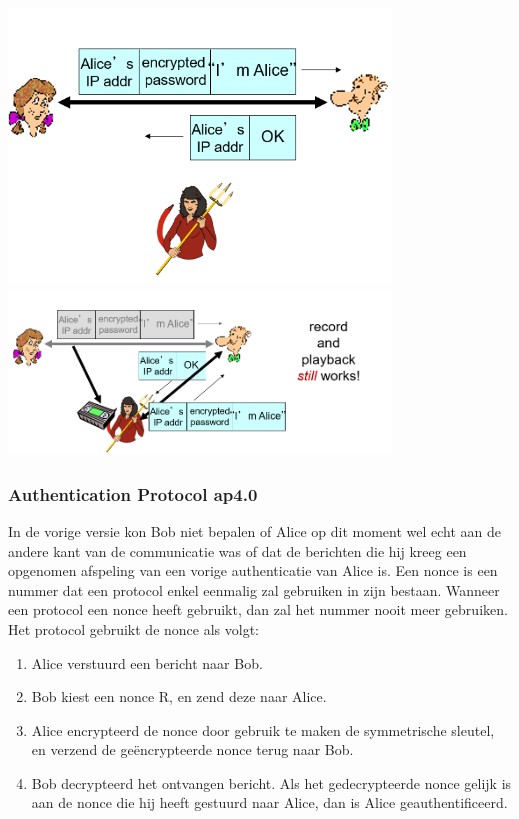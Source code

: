 \includegraphics[width=4in]{./img/imghfdst8/hfdst8puntje18.png}\\[1cm]

\includegraphics[width=4in]{./img/imghfdst8/hfdst8puntje19.png}\\[1cm]

\subsubsection{Authentication Protocol ap4.0}

In de vorige versie kon Bob niet bepalen of Alice op dit moment wel echt aan de andere kant van de communicatie was of dat de berichten die hij kreeg een opgenomen afspeling van een vorige authenticatie van Alice is. Een nonce is een nummer dat een protocol enkel eenmalig zal gebruiken in zijn bestaan. Wanneer een protocol een nonce heeft gebruikt, dan zal het nummer nooit meer gebruiken. Het protocol gebruikt de nonce als volgt:
\begin{enumerate}
    \item Alice verstuurd een bericht naar Bob.
\item Bob kiest een nonce R, en zend deze naar Alice.
\item Alice encrypteerd de nonce door gebruik te maken de symmetrische sleutel, en verzend de geëncrypteerde nonce terug naar Bob.
\item Bob decrypteerd het ontvangen bericht. Als het gedecrypteerde nonce gelijk is aan de nonce die hij heeft gestuurd naar Alice, dan is Alice geauthentificeerd.

\end{enumerate}

